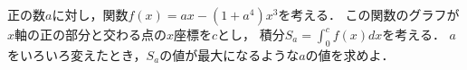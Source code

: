 \documentclass[../../main.tex]{subfiles}
\begin{document}
正の数$a$に対し，関数$f(x)=ax-(1+a^4)x^3$を考える．
この関数のグラフが$x$軸の正の部分と交わる点の$x$座標を$c$とし，
積分$\displaystyle S_a=\int_0^cf(x)dx$を考える．
$a$をいろいろ変えたとき，$S_a$の値が最大になるような$a$の値を求めよ．
\end{document}
